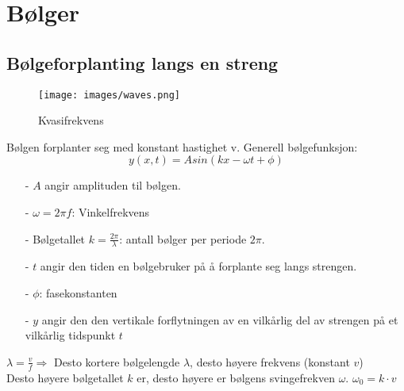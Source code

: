 \documentclass[12pt]{article}
\begin{document}
\section{Bølger}
\subsection{Bølgeforplanting langs en streng}
\begin{figure} [H]
    \centering
    \texttt{[image: images/waves.png]}
    \caption{Kvasifrekvens}
\end{figure}
Bølgen forplanter seg med konstant hastighet v.
Generell bølgefunksjon:
$$y(x,t) = A sin(kx-\omega t + \phi)$$
\begin{itemize}
    \item[-] $A$ angir amplituden til bølgen.
    \item[-] $\omega = 2\pi f$: Vinkelfrekvens
    \item[-] Bølgetallet $k = \frac{2\pi}{\lambda}$: antall bølger per periode $2 \pi$. 
    \item[-] $t$ angir den tiden en bølgebruker på å forplante seg langs strengen.
    \item[-] $\phi$: fasekonstanten
    \item[-] $y$ angir den den vertikale forflytningen av en vilkårlig del av strengen på et vilkårlig tidspunkt $t$
\end{itemize}
$\lambda = \frac{v}{f} \Rightarrow$ Desto kortere bølgelengde $\lambda$, desto høyere frekvens (konstant $v$)\\
Desto høyere bølgetallet $k$ er, desto høyere er bølgens svingefrekven $\omega$. $\omega_0 = k\cdot v$
\end{document}

